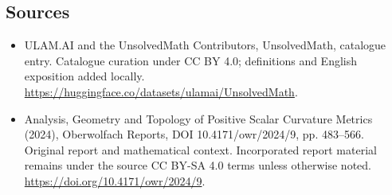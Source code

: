\documentclass[11pt]{article}
\begin{document}
\subsection{Sources}
\begin{itemize}
\item[\hypertarget{source:statement:1}{S1}] ULAM.AI and the UnsolvedMath Contributors, UnsolvedMath, catalogue entry. Catalogue curation under CC BY 4.0; definitions and English exposition added locally.
\url{https://huggingface.co/datasets/ulamai/UnsolvedMath}.
\item[\hypertarget{source:statement:2}{S2}] Analysis, Geometry and Topology of Positive Scalar Curvature Metrics (2024), Oberwolfach Reports, DOI 10.4171/owr/2024/9, pp. 483--566. Original report and mathematical context. Incorporated report material remains under the source CC BY-SA 4.0 terms unless otherwise noted.
\url{https://doi.org/10.4171/owr/2024/9}.
\end{itemize}
\label{end:statement}
\end{document}
